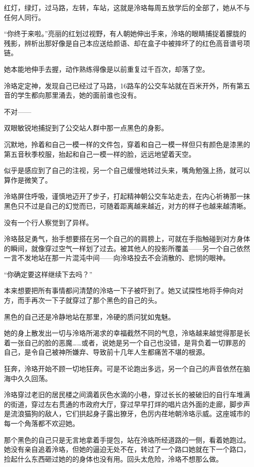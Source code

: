 \documentclass[UTF8, scheme = chinese, openany]{ctexbook}
\begin{document}
红灯，绿灯，过马路，左转，车站，这就是泠珞每周五放学后的全部了，她从不与任何人同行。

“你终于来啦。”亮丽的红划过视野，有人朝她伸出手来，泠珞的眼睛捕捉着朦胧的残影，辨析出那好像是自己本应送给颜语、却在盒子中被摔坏了的红色高音谱号项链。

她本能地伸手去握，动作熟练得像是以前重复过千百次，却落了空。

泠珞定定神，发现自己已经过了马路，16路车的公交车站就在百米开外，所有第五音的学生都向那里涌去，她的面前谁也没有。

不对——

双眼敏锐地捕捉到了公交站人群中那一点黑色的身影。

沉默地，拎着和自己一模一样的文件包，穿着和自己一模一样但只有颜色是漆黑的第五音秋季校服，抬起和自己一模一样的脸，远远地望着天空。

似乎是感应到了自己的注视，另一个自己缓慢地转过头来，嘴角勉强上扬，就可以算作是微笑了。

泠珞屏住呼吸，谨慎地迈开了步子，打起精神朝公交车站走去，在内心祈祷那一抹黑色只不过是自己的幻觉而已，可随着距离越来越近，对方的样子也越来越清晰。

没有一个行人察觉到了异样。

泠珞鼓足勇气，抬手想要搭在另一个自己的的肩膀上，可就在手指触碰到对方身体的瞬间，就像穿过空气一样划了过去。被其他人的投影所覆盖——另一个自己依然一言不发地站在那一片混沌中间——向泠珞投去不会消散的、悲悯的眼神。

“你确定要这样继续下去吗？”

本来想要把所有事情都问清楚的泠珞一下子被吓到了。她又试探性地将手伸向对方，而手再次一下子就穿过了那个黑色的自己的头。

黑色的自己还是冷静地站在那里，冷硬的质问犹如鬼魅。

她的身上散发出一切与泠珞所渴求的幸福截然不同的气息，泠珞越来越觉得那是长着一张自己的脸的恶魔……或者，说她是另一个自己也没错，是背负着一切罪恶的自己，是令自己被神所嫌弃、导致前十几年人生都痛苦不堪的根源。

狂奔，泠珞开始不顾一切地狂奔。可是不论跑出多远，另一个自己的声音依然在脑海中久久回荡。

泠珞穿过老旧的居民楼之间滴着灰色水滴的小巷，穿过长长的被破旧的自行车堆满的街道，穿过左右贯通的市政府大厅，穿过早早打烊的唱片店外面的走廊，脚步声是流浪猫狗的敌人，它们拱起身子露出獠牙，色厉内荏地朝泠珞示威。这座城市的每一个角落都不欢迎她。

那个黑色的自己只是无言地拿着手提包，站在泠珞所经道路的一侧，看着她跑过。她没有亲自追着泠珞，但她的逼迫无处不在，转过了一个路口她就在下一个路口，捡起什么东西砸过她的的身体也没有用。回头太危险，泠珞不想那么做。
\end{document}
